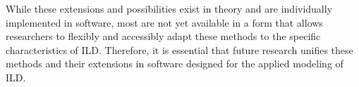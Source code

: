 \documentclass[man, floatsintext]{apa7}
\begin{document}
While these extensions and possibilities exist in theory and are individually
implemented in software, most are not yet available in a form that allows
researchers to flexibly and accessibly adapt these methods to the specific
characteristics of ILD\@. Therefore, it is essential that future research
unifies these methods and their extensions in software designed for the applied
modeling of ILD\@.

\printbibliography[]
\end{document}
